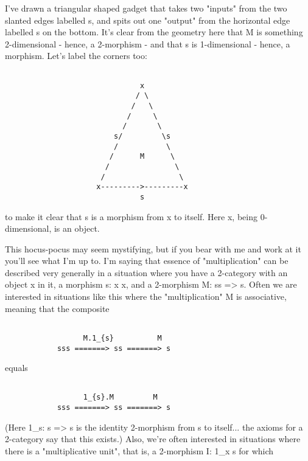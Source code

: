 I've drawn a triangular shaped gadget that takes two "inputs"
from the two slanted edges labelled s, and spits out one "output"
from the horizontal edge labelled s on the bottom.   It's clear
from the geometry here that M is something 2-dimensional - hence, a
2-morphism - and that s is 1-dimensional - hence, a morphism.
Let's label the corners too:


\begin{verbatim}

                               x
                              / \
                             /   \
                            /     \
                           /       \
                         s/         \s
                         /           \
                        /      M      \
                       /               \
                      /                 \
                     x--------->---------x
                               s

\end{verbatim}
    
to make it clear that s is a morphism from x to itself.  Here x,
being 0-dimensional, is an object. 

This hocus-pocus may seem mystifying, but if you bear with me and work
at it you'll see what I'm up to.  I'm saying that essence of
"multiplication" can be described very generally in a situation where
you have a 2-category with an object x in it, a morphism s: x \to  x, and
a 2-morphism M: ss => s.  Often we are interested in situations like
this where the "multiplication" M is associative, meaning that the
composite


\begin{verbatim}

                  M.1_{s}          M
            sss =======> ss =======> s

\end{verbatim}
    
equals


\begin{verbatim}

                  1_{s}.M         M
            sss =======> ss =======> s

\end{verbatim}
    
(Here 1_{s}: s => s is the identity 2-morphism from s to itself... the axioms
for a 2-category say that this exists.)  Also, we're often interested in
situations where there is a "multiplicative unit", that is, a 2-morphism
I: 1_{x} \to  s for which


